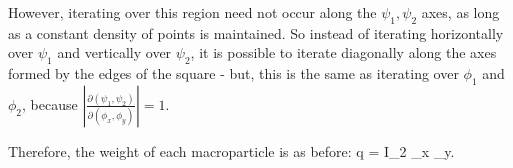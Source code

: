 However, iterating over this region need not occur along the $\psi_1,\psi_2$ axes, as long as a constant density of points is maintained.  So instead of iterating horizontally over $\psi_1$ and vertically over $\psi_2$, it is possible to iterate diagonally along the axes formed by the edges of the square - but, this is the same as iterating over $\phi_1$ and $\phi_2$, because $\left\vert\frac{\partial(\psi_1,\psi_2)}{\partial(\phi_x,\phi_y)}\right\vert = 1$.

Therefore, the weight of each macroparticle is as before:
\Begineq
	q =  \Delta I_2 \Delta \phi_x \Delta \phi_y.
\Endeq



